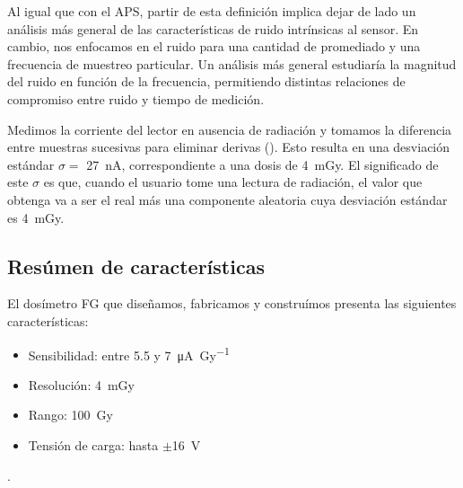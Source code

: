 Al igual que con el APS, partir de esta definición
implica dejar de lado un análisis más general de las características de ruido
intrínsicas al sensor.
En cambio, nos enfocamos en el ruido para una cantidad de promediado
y una frecuencia de muestreo particular.
Un análisis más general estudiaría 
la magnitud del ruido en función de la frecuencia,
permitiendo distintas relaciones de compromiso 
entre ruido y tiempo de medición.

Medimos la corriente del lector en ausencia de radiación y
tomamos la diferencia entre muestras sucesivas para eliminar derivas
().
Esto resulta en una desviación estándar
$\sigma=$ \SI{27}{\nano\ampere},
correspondiente a una dosis de \SI{4}{\milli\gray}.
El significado de este $\sigma$ es que,
cuando el usuario tome una lectura de radiación,
el valor que obtenga va a ser el real más una componente aleatoria
cuya desviación estándar es \SI{4}{\milli\gray}.
\subsection{Resúmen de características}
El dosímetro FG que diseñamos, fabricamos y construímos presenta las
siguientes características:
\begin{itemize}
    \item Sensibilidad: entre 5.5 y \SI{7}{\micro\ampere\per\gray}
    \item Resolución: \SI{4}{\milli\gray}
    \item Rango: \SI{100}{\gray}
    \item Tensión de carga: hasta $\pm$\SI{16}{\volt}
\end{itemize}.
